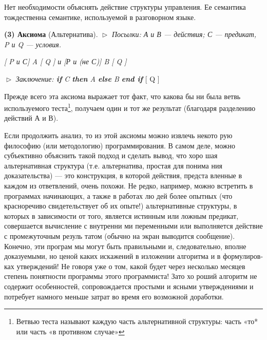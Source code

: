 \parindent=1cm Нет необходимости объяснять действие структуры  управления.  Ее 
семантика тождественна семантике, используемой в разговорном языке.
\newline
\pagebreak

\noindent \textbf{(3) Аксиома} (Альтернатива).
\newline
$\vartriangleright$ \textit{Посылки: А и В --- действия; С --- предикат, P и Q --- условия.}
\begin{center}
\textit{[ P и С] A [ Q ]  и [Р и (не С)] B [ Q ]}
\end{center}

\noindent $\vartriangleright$ \textit{Заключение:  \textbf{if} \textit{C} \textbf{then} \textit{A} \textbf{else} \textit{B} \textbf{end if}} [ Q ]
\newline

\noindent Прежде всего эта аксиома выражает тот факт, что какова бы ни 
была  ветвь  используемого  теста\footnote{ Ветвью теста называют каждую часть альтернативной структуры: часть «то*
или часть «в  противном случае»}, получаем  один  и  тот  же  результат 
(благодаря разделению действий А и В).

\parindent=1cm Если продолжить анализ, то из этой аксиомы можно извлечь некото­
рую философию  (или  методологию)  программирования.  В  самом деле, 
можно субъективно объяснить такой подход и сделать вывод, что хоро­
шая альтернативная структура (т.е. альтернатива, простая для понима­
ния доказательства)  — это конструкция, в которой действия,  предста­
вленные  в каждом  из  ответвлений, очень  похожи.  Не редко,  например, 
можно  встретить  в  программах  начинающих,  а  также  в  работах лю­
дей  более  опытных  (что  красноречиво  свидетельствует  об  их опыте!) 
альтернативные структуры, в которых в зависимости от того, является 
истинным или ложным предикат, совершается вычисление с внутренни­
ми переменными  или выполняется действие  с промежуточным резуль­
татом (обычно на экран выводится сообщение). Конечно, эти програм­
мы  могут  быть  правильными  и,  следовательно,  вполне  доказуемыми, 
но  ценой  каких  искажений  в  изложении  алгоритма  и  в  формулиров­
ках  утверждений!  Не  говоря  уже  о  том,  какой  будет через  несколько 
месяцев степень понятности программы этого программиста! Зато хо­
роший алгоритм не содержит особенностей, сопровождается простыми 
и ясными утверждениями и потребует намного меньше затрат во время 
его возможной доработки.

